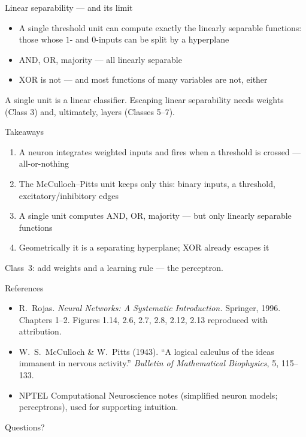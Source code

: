 \documentclass[aspectratio=169, 11pt]{beamer}
\begin{document}
\begin{frame}{Linear separability --- and its limit}
  \begin{itemize}
    \item A single threshold unit can compute exactly the
          \alert{linearly separable} functions: those whose
          $1$- and $0$-inputs can be split by a hyperplane
    \item AND, OR, majority --- all linearly separable
    \item XOR is not --- and most functions of many variables
          are not, either
  \end{itemize}
  \vspace{0.3em}
  \begin{redhighlight}
    A single unit is a linear classifier. Escaping
    linear separability needs \alert{weights} (Class 3) and,
    ultimately, \alert{layers} (Classes 5--7).
  \end{redhighlight}
\end{frame}

\begin{frame}{Takeaways}
  \begin{enumerate}\setlength{\itemsep}{2pt}
    \item A neuron integrates weighted inputs and fires when a
          \alert{threshold} is crossed --- all-or-nothing
    \item The \alert{McCulloch--Pitts unit} keeps only this:
          binary inputs, a threshold, excitatory/inhibitory
          edges
    \item A single unit computes AND, OR, majority --- but
          only \alert{linearly separable} functions
    \item Geometrically it is a \alert{separating hyperplane};
          XOR already escapes it
  \end{enumerate}
  \vspace{0.3em}
  \begin{redhighlight}
    Class~3: add \alert{weights} and a \alert{learning rule}
    --- the perceptron.
  \end{redhighlight}
\end{frame}

\begin{frame}{References}
  \footnotesize
  \begin{itemize}
    \item R.~Rojas. \textit{Neural Networks: A Systematic
          Introduction.} Springer, 1996. Chapters 1--2.
          Figures 1.14, 2.6, 2.7, 2.8, 2.12, 2.13 reproduced
          with attribution.
    \item W.~S.~McCulloch \& W.~Pitts (1943). ``A logical
          calculus of the ideas immanent in nervous
          activity.'' \textit{Bulletin of Mathematical
          Biophysics}, 5, 115--133.
    \item NPTEL Computational Neuroscience notes (simplified
          neuron models; perceptrons), used for supporting
          intuition.
  \end{itemize}
\end{frame}

\begin{frame}[standout]
  Questions?
\end{frame}
\end{document}
